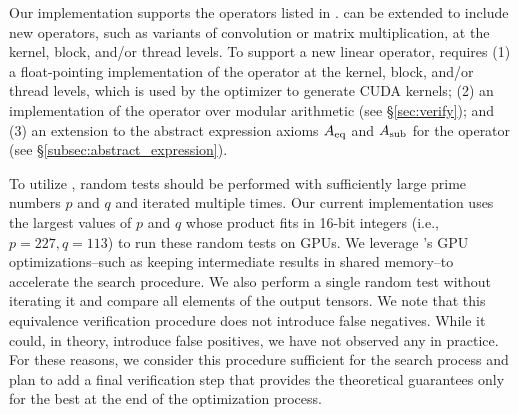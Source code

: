 Our implementation supports the operators listed in .
%
\sys can be extended to include new operators, such as variants of convolution or matrix multiplication, at the kernel, block, and/or thread levels.
To support a new linear operator, \sys requires (1) a float-pointing implementation of the operator at the kernel, block, and/or thread levels, which is used by the \graph optimizer to generate CUDA kernels; (2) an implementation of the operator over modular arithmetic (see \S\ref{sec:verify}); and (3) an extension to the abstract expression axioms $A_\text{eq}$ and $A_\text{sub}$ for the operator (see \S\ref{subsec:abstract_expression}).
%

To utilize , random tests should be performed with sufficiently large prime numbers $p$ and $q$ and iterated multiple times. Our current implementation uses the largest values of $p$ and $q$ whose product fits in 16-bit integers (i.e., $p=227, q=113$) to run these random tests on GPUs. We leverage \sys's GPU optimizations--such as keeping intermediate results in shared memory--to accelerate the search procedure.
We also perform a single random test without iterating it and compare all elements of the output tensors.
We note that this equivalence verification procedure does not introduce false negatives.
While it could, in theory, introduce false positives, we have not observed any in practice.
For these reasons, we consider this procedure sufficient for the search process and plan to add a final verification step that provides the theoretical guarantees only for the best \graph at the end of the optimization process.

